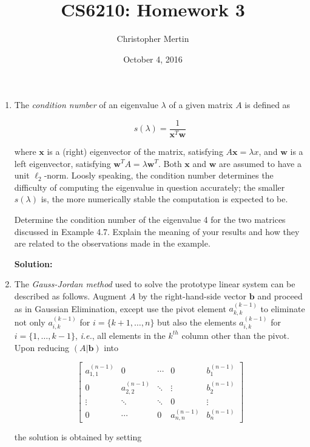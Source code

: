 \documentclass[12pt]{article}
\begin{document}
\title{CS6210: Homework 3}
\author{Christopher Mertin}
\date{October 4, 2016}
\maketitle

\begin{enumerate}
\item The {\em condition number} of an eigenvalue $\lambda$ of a given matrix $A$ is defined as

\[
s(\lambda) = \frac{1}{\mathbf{x}^{T}\mathbf{w}}
\]

where $\mathbf{x}$ is a (right) eigenvector of the matrix, satisfying $A\mathbf{x} = \lambda x$,
and $\mathbf{w}$ is a left eigenvector, satisfying $\mathbf{w}^{T}A = \lambda \mathbf{w}^{T}$.
Both $\mathbf{x}$ and $\mathbf{w}$ are assumed to have a unit $\ell_{2}$-norm. Loosly speaking,
the condition number determines the difficulty of computing the eigenvalue in question accurately;
the smaller $s(\lambda)$ is, the more numerically stable the computation is expected to be.

Determine the condition number of the eigenvalue 4 for the two matrices discussed in Example 4.7.
Explain the meaning of your results and how they are related to the observations made in the example.

{\bf Solution:}

\item The {\em Gauss-Jordan method} used to solve the prototype linear system can be described
as follows. Augment $A$ by the right-hand-side vector $\mathbf{b}$ and proceed as in Gaussian Elimination,
except use the pivot element $a_{k,k}^{(k-1)}$ to eliminate not only $a_{i,k}^{(k-1)}$ for $i = \{ k+1, \ldots, n\}$
but also the elements $a_{i,k}^{(k-1)}$ for $i = \{1, \ldots, k-1\}$, {\em i.e.}, all elements in the $k^{th}$ column
other than the pivot. Upon reducing $(A|\mathbf{b})$ into

\[
\left[
\begin{array}{cccc|c}
  a_{1,1}^{(n-1)} & 0 & \cdots & 0 & b_{1}^{(n-1)}\\
  0 & a_{2,2}^{(n-1)} & \ddots & \vdots & b_{2}^{(n-1)}\\
  \vdots & \ddots & \ddots & 0 & \vdots\\
  0 & \cdots & 0 & a_{n,n}^{(n-1)} & b_{n}^{(n-1)}
\end{array}\right]
\]

the solution is obtained by setting


\end{enumerate}
\end{document}

